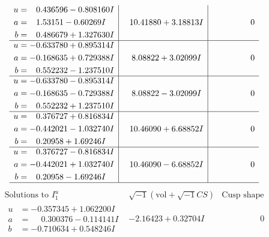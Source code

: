 \documentclass[1p]{elsarticle_modified}
\theoremstyle{definition}
\newcommand{\I}{\sqrt{-1}}
\begin{document}
$$\begin{array}{c|c|c}
\begin{aligned}
u &= \phantom{-}0.436596 - 0.808160 I \\
a &= \phantom{-}1.53151 - 0.60269 I \\
b &= \phantom{-}0.486679 + 1.327630 I\end{aligned}
 & \phantom{-}10.41880 + 3.18813 I & \phantom{-0.000000 } 0 \\ \hline\begin{aligned}
u &= -0.633780 + 0.895314 I \\
a &= -0.168635 + 0.729388 I \\
b &= \phantom{-}0.552232 - 1.237510 I\end{aligned}
 & \phantom{-}8.08822 + 3.02099 I & \phantom{-0.000000 } 0 \\ \hline\begin{aligned}
u &= -0.633780 - 0.895314 I \\
a &= -0.168635 - 0.729388 I \\
b &= \phantom{-}0.552232 + 1.237510 I\end{aligned}
 & \phantom{-}8.08822 - 3.02099 I & \phantom{-0.000000 } 0 \\ \hline\begin{aligned}
u &= \phantom{-}0.376727 + 0.816834 I \\
a &= -0.442021 - 1.032740 I \\
b &= \phantom{-}0.20958 + 1.69246 I\end{aligned}
 & \phantom{-}10.46090 + 6.68852 I & \phantom{-0.000000 } 0 \\ \hline\begin{aligned}
u &= \phantom{-}0.376727 - 0.816834 I \\
a &= -0.442021 + 1.032740 I \\
b &= \phantom{-}0.20958 - 1.69246 I\end{aligned}
 & \phantom{-}10.46090 - 6.68852 I & \phantom{-0.000000 } 0\\
 \hline 
 \end{array}$$\newpage$$\begin{array}{c|c|c}  
\text{Solutions to }I^u_{1}& \I (\text{vol} + \sqrt{-1}CS) & \text{Cusp shape}\\
 \hline 
\begin{aligned}
u &= -0.357345 + 1.062200 I \\
a &= \phantom{-}0.300376 - 0.114141 I \\
b &= -0.710634 + 0.548246 I\end{aligned}
 & -2.16423 + 0.32704 I & \phantom{-0.000000 } 0 \\ \hline\begin{aligned}

\end{aligned}
\end{array}$$
\end{document}

